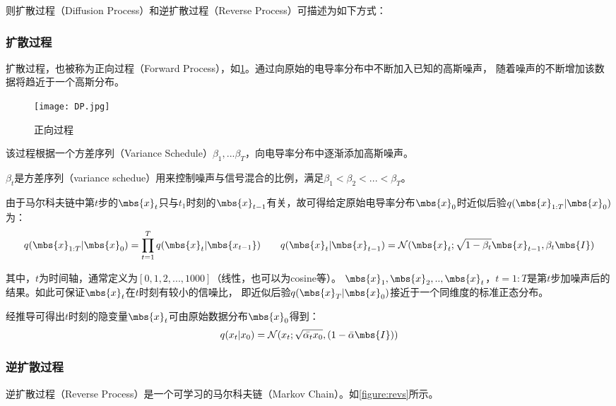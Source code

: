 则扩散过程（Diffusion Process）和逆扩散过程（Reverse Process）可描述为如下方式：

\subsubsection{扩散过程}

扩散过程，也被称为正向过程（Forward Process），如\cref{figure:dp}。通过向原始的电导率分布中不断加入已知的高斯噪声，
随着噪声的不断增加该数据将趋近于一个高斯分布。

\begin{figure}[h]
    \centering
    \texttt{[image: DP.jpg]}
    \caption{正向过程}
    \label{figure:dp}
\end{figure}

该过程根据一个方差序列（Variance Schedule）$\beta_1, ...\beta_T$，向电导率分布中逐渐添加高斯噪声。

$\beta_t$是方差序列（variance schedue）用来控制噪声与信号混合的比例，满足$\beta_1 < \beta_2 <...<\beta_T$。

由于马尔科夫链中第$t$步的$\mbs{x}_{t}$只与$t_1$时刻的$\mbs{x}_{t-1}$有关，故可得给定原始电导率分布$\mbs{x}_0$时近似后验$q(\mbs{x}_{1:T}|\mbs{x}_0)$为：
\begin{equation}
    \centering
    q(\mbs{x}_{1:T}|\mbs{x}_0) = \prod_{t=1}^{T} q(\mbs{x}_{t}|\mbs{x_{t-1}}) \qquad
    q(\mbs{x}_{t}|\mbs{x}_{t-1}) = \mathcal{N}(\mbs{x}_{t}; \sqrt{1-\beta_t}\mbs{x}_{t-1}, \beta_t\mbs{I})
    \label{equation:ddpm_f}
  \end{equation}

其中，$t$为时间轴，通常定义为$[0,1,2,...,1000]$（线性，也可以为cosine等）。
$\mbs{x}_1, \mbs{x}_2,..,\mbs{x}_{t}$，$t=1:T$是第$t$步加噪声后的结果。如此可保证$\mbs{x}_{t}$在$t$时刻有较小的信噪比，
即近似后验$q(\mbs{x}_{T}|\mbs{x}_0)$接近于一个同维度的标准正态分布。

经推导可得出$t$时刻的隐变量$\mbs{x}_{t}$可由原始数据分布$\mbs{x}_0$得到：
\begin{equation}
  \centering
  q(x_t|x_0) = \mathcal{N}(x_t; \sqrt{\bar{\alpha_t}x_0}, (1-\bar{\alpha}\mbs{I}))
\end{equation}


\subsubsection{逆扩散过程}

逆扩散过程（Reverse Process）是一个可学习的马尔科夫链（Markov Chain）。如\cref{figure:revs}所示。

